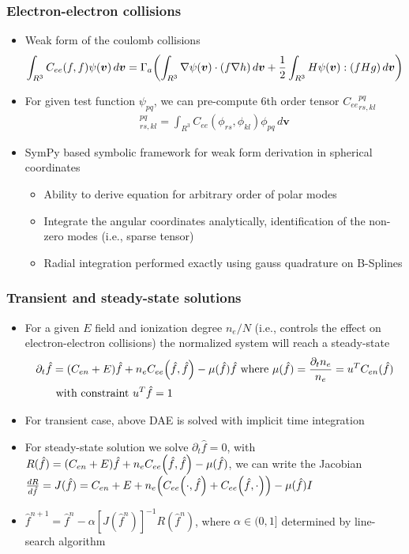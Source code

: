 \documentclass[mathserif, aspectratio=169]{beamer}
\newcommand{\vect}[1]{\boldsymbol{#1}}
\newcommand{\of}[1]{\mleft( #1 \mright)}
\newcommand{\diff}[1]{\, d#1}
\begin{document}
\begin{frame}
	\frametitle{Electron-electron collisions}
	\begin{itemize}
		\item Weak form of the coulomb collisions
		\begin{align*}
			\int_{R^3} C_{ee}(f,f) \psi(\vect{v})\diff{\vect{v}} = \Gamma_a \of{\int_{R^3} \nabla \psi\of{\vect{v}} \cdot (f \nabla h ) \diff{\vect{v}}  + \frac{1}{2} \int_{R^3} H\psi\of{\vect{v}} : \of{f H g} \diff{\vect{v}}} 
		\end{align*}
		\item For given test function $\psi_{pq}$, we can pre-compute 6th order tensor ${C_{ee}}_{rs,kl}^{pq}$
		\begin{align*}
			[C_{ee}]_{rs,kl}^{pq} = \int_{R^3} C_{ee}(\phi_{rs}, \phi_{kl}) \phi_{pq} \diff{\vect{v}} 
		\end{align*}
		\item SymPy based symbolic framework for weak form derivation in spherical coordinates
		\begin{itemize}
			\item Ability to derive equation for arbitrary order of polar modes
			\item Integrate the angular coordinates analytically, identification of the non-zero modes (i.e., sparse tensor) 
			\item Radial integration performed exactly using gauss quadrature on B-Splines
		\end{itemize}
	\end{itemize}
\end{frame}

\begin{frame}
	\frametitle{Transient and steady-state solutions}
	\begin{itemize}
		\item For a given $E$ field and ionization degree $n_e/N$ (i.e., controls the effect on electron-electron collisions) the normalized system will reach a steady-state
		\begin{align*}
			\partial_t {\hat{f}} &=(C_{en}+E)\hat{f} + n_e C_{ee}\of{\hat{f}, \hat{f}} - \mu(\hat{f}) \hat{f} \text{ where } \mu(\hat{f}) = \frac{\partial_t n_e}{n_e} = u^T C_{en}(\hat{f})\\
			&\text{ with constraint } u^T \hat{f} = 1  
		\end{align*}
		\item For transient case, above DAE is solved with implicit time integration
		\item For steady-state solution we solve $\partial_t {\hat{f}} = 0$, with $R(\hat{f}) = (C_{en}+E)\hat{f} + n_e C_{ee}\of{\hat{f}, \hat{f}} - \mu(\hat{f})$, we can write the Jacobian $\frac{d R}{d\hat{f}} = J(\hat{f}) = C_{en} + E + n_e \of{C_{ee}\of{\cdot,\hat{f}} + C_{ee}\of{\hat{f},\cdot}} -\mu(\hat{f})I$
		\item $\hat{f}^{n+1} = \hat{f}^{n} - \alpha [J(\hat{f}^n)]^{-1}R(\hat{f}^n)$, where $\alpha \in(0,1]$ determined by line-search algorithm 
	\end{itemize}
\end{frame}
\end{document}
